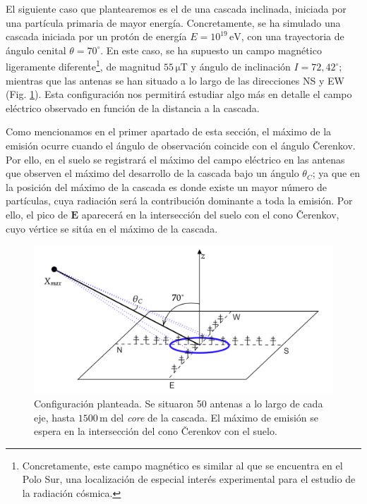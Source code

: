 \documentclass[12 pt, a4paper]{article} %
\numberwithin{equation}{section}
\numberwithin{figure}{section}
\newcommand{\vect}[1]{\boldsymbol{\mathbf{#1}}}
\begin{document}
El siguiente caso que plantearemos es el de una cascada inclinada, iniciada por una partícula primaria de mayor energía. Concretamente, se ha simulado una cascada iniciada por un protón de energía $E=10^{19}\,\mathrm{eV}$, con una trayectoria de ángulo cenital $\theta=70^{\circ}$. En este caso, se ha supuesto un campo magnético ligeramente diferente\footnote{ Concretamente, este campo magnético es similar al que se encuentra en el Polo Sur, una localización de especial interés experimental para el estudio de la radiación cósmica.}, de magnitud $55\,\mathrm{\mu T}$ y ángulo de inclinación $I = 72,42^\circ$; mientras que las antenas se han situado a lo largo de las direcciones NS y EW (Fig. \ref{ANITApaper_showscheme}). Esta configuración nos permitirá estudiar algo más en detalle el campo eléctrico observado en función de la distancia a la cascada.

Como mencionamos en el primer apartado de esta sección, el máximo de la emisión ocurre cuando el ángulo de observación coincide con el ángulo \v{C}erenkov. Por ello, en el suelo se registrará el máximo del campo eléctrico en las antenas que observen el máximo del desarrollo de la cascada bajo un ángulo $\theta_C$; ya que en la posición del máximo de la cascada es donde existe un mayor número de partículas, cuya radiación será la contribución dominante a toda la emisión. Por ello, el pico de $\vect{E}$ aparecerá en la intersección del suelo con el cono \v{C}erenkov, cuyo vértice se sitúa en el máximo de la cascada. 
\begin{figure}[H]
	\centering
	\includegraphics[width=.6\linewidth]{figures/radio/ANITApaper_showscheme}
	\caption{Configuración planteada. Se situaron 50 antenas a lo largo de cada eje, hasta $1500\,\mathrm{m}$ del \textit{core} de la cascada. El máximo de emisión se espera en la intersección del cono \v{C}erenkov con el suelo.}
	\label{ANITApaper_showscheme}
\end{figure}
\end{document}
